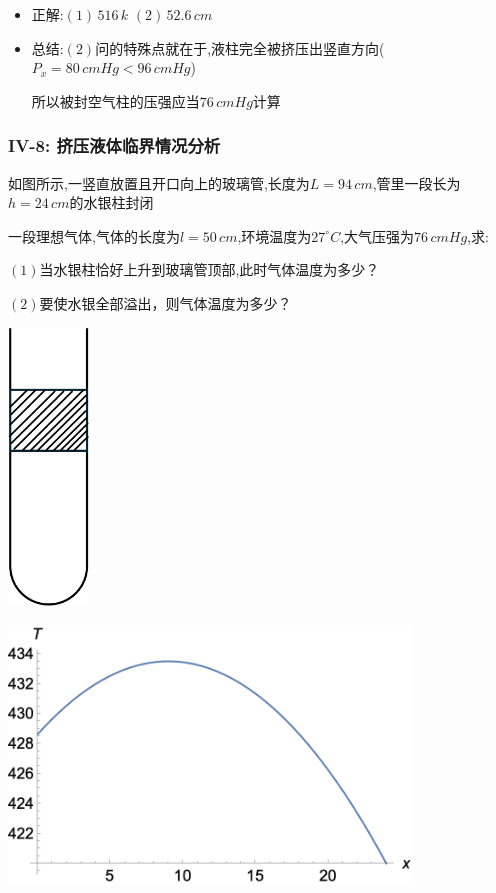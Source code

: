 \documentclass{article}
\begin{document}
\begin{itemize}
    \item 正解:\quad $(1) \, 516 \, k$  $(2) \, 52.6 \, cm $
    \item 总结:\quad $(2)$问的特殊点就在于,液柱完全被挤压出竖直方向($P_{x} = 80 \, cmHg < 96 \, cmHg$)

          \hspace{3.2em}所以被封空气柱的压强应当$76 \, cmHg$计算
\end{itemize}

\vspace{2em}

\subsubsection{IV-8: 挤压液体临界情况分析}
如图所示,一竖直放置且开口向上的玻璃管,长度为$L = 94 \, cm$,管里一段长为$h = 24 \, cm$的水银柱封闭

一段理想气体,气体的长度为$l = 50 \, cm$,环境温度为$27 ^{\circ} C$,大气压强为$76 \, cmHg$,求:

$(1)$当水银柱恰好上升到玻璃管顶部,此时气体温度为多少？

$(2)$要使水银全部溢出，则气体温度为多少？

\vspace{1em}

\begin{minipage}{0.4\textwidth}
    \includegraphics[width = 0.16\textwidth,keepaspectratio]{./pictures/2.3-19.png}
\end{minipage}
\hfill
\begin{minipage}{0.5\textwidth}
    \includegraphics[width = 0.8\textwidth,keepaspectratio]{./pictures/2.3-20.png}
\end{minipage}
\end{document}
